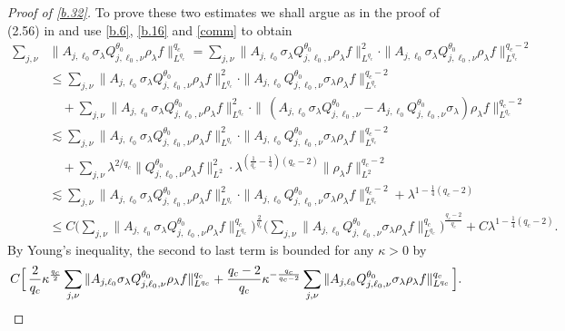 \documentclass[10pt]{amsart}
\newcommand{\la}{\lambda}
\newcommand{\1}{{\bf 1}}
\begin{document}
\begin{proof}[Proof of \eqref{b.32}]
To prove these two estimates we shall argue as in the proof of (2.56) in \cite{HSp} and use \eqref{b.6}, \eqref{b.16}
 and \eqref{comm} to obtain
 \begin{align*}
 \sum_{j,\nu} &\| A_{j,\ell_0}\sigma_\la Q^{\theta_0}_{j,\ell_0,\nu}\rho_\la f\|_{L^{q_c}}^{q_c}
 =\sum_{j,\nu} \| A_{j,\ell_0}\sigma_\la Q^{\theta_0}_{j,\ell_0,\nu}\rho_\la f\|_{L^{q_c}}^2 \cdot
  \| A_{j,\ell_0}\sigma_\la Q^{\theta_0}_{j,\ell_0,\nu}\rho_\la f\|_{L^{q_c}}^{q_c-2}
  \\
  &\le \sum_{j,\nu}  \| A_{j,\ell_0}\sigma_\la Q^{\theta_0}_{j,\ell_0,\nu}\rho_\la f\|_{L^{q_c}}^2 \cdot
  \| A_{j,\ell_0} Q^{\theta_0}_{j,\ell_0,\nu}  \sigma_\la  \rho_\la f\|_{L^{q_c}}^{q_c-2}
  \\
  &\quad +\sum_{j,\nu} \| A_{j,\ell_0}\sigma_\la Q^{\theta_0}_{j,\ell_0,\nu}\rho_\la f\|_{L^{q_c}}^2 \cdot
  \| \, (A_{j,\ell_0}\sigma_\la Q^{\theta_0}_{j,\ell_0,\nu}-A_{j,\ell_0}Q^{\theta_0}_{j,\ell_0,\nu}\sigma_\la)\rho_\la f\|^{q_c-2}_{L^{q_c}}
  \\
  &\lesssim \sum_{j,\nu} \| A_{j,\ell_0}\sigma_\la Q^{\theta_0}_{j,\ell_0,\nu}\rho_\la f\|_{L^{q_c}}^2 \cdot
  \| A_{j,\ell_0} Q^{\theta_0}_{j,\ell_0,\nu}  \sigma_\la  \rho_\la f\|_{L^{q_c}}^{q_c-2}
  \\
  &\quad +\sum_{j,\nu} \la^{2/q_c} \|Q^{\theta_0}_{j,\ell_0,\nu}\rho_\la f\|_{L^2}^2 \cdot \la^{(\frac1{q_c}-\frac14) (q_c-2)} \| \rho_\la f\|_{L^2}^{q_c-2}
  \\&\lesssim \sum_{j,\nu} \| A_{j,\ell_0}\sigma_\la Q^{\theta_0}_{j,\ell_0,\nu}\rho_\la f\|_{L^{q_c}}^2 \cdot
  \| A_{j,\ell_0} Q^{\theta_0}_{j,\ell_0,\nu}  \sigma_\la  \rho_\la f\|_{L^{q_c}}^{q_c-2} +\la^{1-\frac14 (q_c-2)}
  \\
  &\le C\bigl(\sum_{j,\nu} \| A_{j,\ell_0}\sigma_\la Q^{\theta_0}_{j,\ell_0,\nu}\rho_\la f\|_{L^{q_c}}^{q_c}\bigr)^{\frac2{q_c}}
  \bigl(\sum_{j,\nu} \| A_{j,\ell_0} Q^{\theta_0}_{j,\ell_0,\nu}  \sigma_\la  \rho_\la f\|_{L^{q_c}}^{q_c} \bigr)^{\frac{q_c-2}{q_c}}+C\la^{1-\frac14(q_c-2)}.
  \end{align*}
   By Young's inequality, the second to last term is bounded for any $\kappa>0$ by
 $$ C\Bigl[\,  \frac2{q_c}\kappa^{\frac{q_c}2}
  \sum_{j,\nu} \|A_{j,\ell_0}\sigma_\la Q^{\theta_0}_{j,\ell_0,\nu}\rho_\la f\|_{L^{q_c}}^{q_c}+
  \frac{q_c-2}{q_c} \kappa^{-\frac{q_c}{q_c-2}}
  \sum_{j,\nu} \| A_{j,\ell_0} Q^{\theta_0}_{j,\ell_0,\nu}\sigma_\la \rho_\la f\|_{L^{q_c}}^{q_c} \, \Bigr].
  $$
 

\end{proof}
\end{document}
